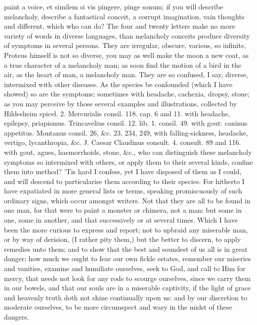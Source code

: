 {paint a voice, et similem si vis pingere, pinge sonum; if you will
describe melancholy, describe a fantastical conceit, a corrupt
imagination, vain thoughts and different, which who can do? The four
and twenty letters make no more variety of words in diverse languages,
than melancholy conceits produce diversity of symptoms in several
persons. They are irregular, obscure, various, so infinite, Proteus
himself is not so diverse, you may as well make the moon a new coat, as
a true character of a melancholy man; as soon find the motion of a bird
in the air, as the heart of man, a melancholy man. They are so
confused, I say, diverse, intermixed with other diseases. As the
species be confounded (which I have showed) so are the symptoms;
sometimes with headache, cachexia, dropsy, stone; as you may perceive
by those several examples and illustrations, collected by 
Hildesheim spicel. 2. Mercurialis consil. 118. cap. 6 and 11. with
headache, epilepsy, priapismus. Trincavelius consil. 12. lib. 1.
consil. 49. with gout: caninus appetitus. Montanus consil. 26, \&c. 23,
234, 249, with falling-sickness, headache, vertigo, lycanthropia, \&c.
J. Caesar Claudinus consult. 4. consult. 89 and 116. with gout, agues,
haemorrhoids, stone, \&c., who can distinguish these melancholy symptoms
so intermixed with others, or apply them to their several kinds,
confine them into method? 'Tis hard I confess, yet I have disposed of
them as I could, and will descend to particularise them according to
their species. For hitherto I have expatiated in more general lists or
terms, speaking promiscuously of such ordinary signs, which occur
amongst writers. Not that they are all to be found in one man, for that
were to paint a monster or chimera, not a man: but some in one, some in
another, and that successively or at several times.
Which I have been the more curious to express and report; not to
upbraid any miserable man, or by way of derision, (I rather pity them,)
but the better to discern, to apply remedies unto them; and to show
that the best and soundest of us all is in great danger; how much we
ought to fear our own fickle estates, remember our miseries and
vanities, examine and humiliate ourselves, seek to God, and call to Him
for mercy, that needs not look for any rods to scourge ourselves, since
we carry them in our bowels, and that our souls are in a miserable
captivity, if the light of grace and heavenly truth doth not shine
continually upon us: and by our discretion to moderate ourselves, to be
more circumspect and wary in the midst of these dangers.

}
